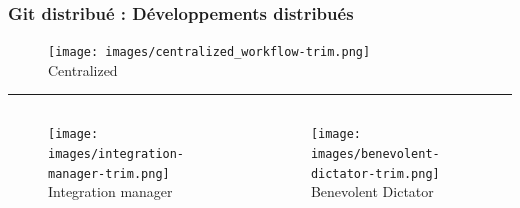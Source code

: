 \documentclass[table,tikz,12pt,svgnames]{beamer}
\begin{document}
\begin{frame}
\frametitle{Git distribué : Développements distribués}

\begin{figure}
	\centering
	\texttt{[image: images/centralized\_workflow-trim.png]}\\
	\small Centralized
\end{figure}

\vspace{-1em}
\color{gray}\rule{\linewidth}{2pt}
\PAUSE
\begin{adjustwidth}{-2cm}{-1cm}{}
	\begin{columns}[T] %
		\begin{column}{.5\textwidth}
			\begin{figure}
				\texttt{[image: images/integration-manager-trim.png]}
				\small {Integration manager}
			\end{figure}
		\end{column}%
		\begin{column}{.6\textwidth}
			\vspace{-0.35em}
			\begin{figure}
				\hfill%
				\texttt{[image: images/benevolent-dictator-trim.png]}
				Benevolent Dictator
			\end{figure}
		\end{column}%
	\end{columns}
\end{adjustwidth}
\end{frame}

\end{document}
